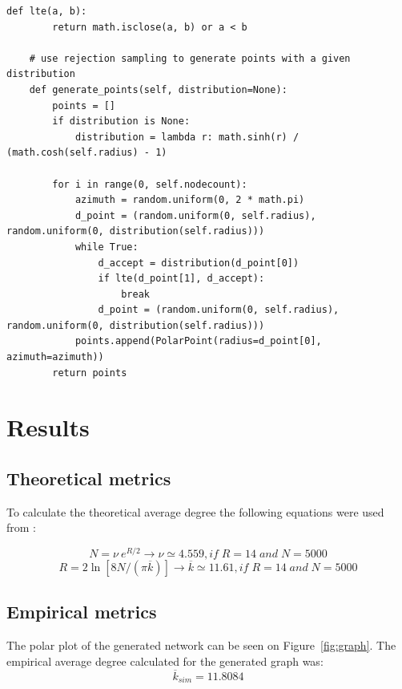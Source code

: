 \documentclass[a4paper]{article}
\begin{document}
\begin{lstlisting}[style=mypython,caption={The function used for generating random nodes},label={lst:python}]
    def lte(a, b):
        return math.isclose(a, b) or a < b
	
    # use rejection sampling to generate points with a given distribution
    def generate_points(self, distribution=None):
        points = []
        if distribution is None:
            distribution = lambda r: math.sinh(r) / (math.cosh(self.radius) - 1)

        for i in range(0, self.nodecount):
            azimuth = random.uniform(0, 2 * math.pi)
            d_point = (random.uniform(0, self.radius), random.uniform(0, distribution(self.radius)))
            while True:
                d_accept = distribution(d_point[0])
                if lte(d_point[1], d_accept):
                    break
                d_point = (random.uniform(0, self.radius), random.uniform(0, distribution(self.radius)))
            points.append(PolarPoint(radius=d_point[0], azimuth=azimuth))
        return points
\end{lstlisting}

\section{Results}
\subsection{Theoretical metrics}
To calculate the theoretical average degree the following equations were used from \cite{HyperbolicGeoNetworks}:

\begin{equation}
N = \nu~e^{R/2} \rightarrow \nu \simeq 4.559 ,if\;R=14\;and\;N=5000
\end{equation}
\begin{equation}
R = 2 \ln[8 N / (\pi \overline{k})] \rightarrow \overline{k} \simeq 11.61, if\;R=14\;and\;N=5000
\end{equation}

\subsection{Empirical metrics}\label{sect:metrics}

The polar plot of the generated network can be seen on Figure~\ref{fig:graph}. The empirical average degree calculated for the generated graph was:
\begin{equation}
\overline{k}_{sim} =  11.8084
\end{equation}
\end{document}
